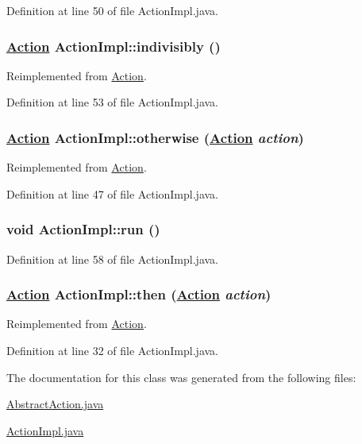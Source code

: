 Definition at line 50 of file Action\-Impl.java.\hypertarget{classActionImpl_a19}{
\subsubsection[indivisibly]{\setlength{\rightskip}{0pt plus 5cm}\hyperlink{interfaceAction}{Action} Action\-Impl::indivisibly ()}}
\label{classActionImpl_a19}




Reimplemented from \hyperlink{interfaceAction_a9}{Action}.

Definition at line 53 of file Action\-Impl.java.\hypertarget{classActionImpl_a17}{
\subsubsection[otherwise]{\setlength{\rightskip}{0pt plus 5cm}\hyperlink{interfaceAction}{Action} Action\-Impl::otherwise (\hyperlink{interfaceAction}{Action} {\em action})}}
\label{classActionImpl_a17}




Reimplemented from \hyperlink{interfaceAction_a7}{Action}.

Definition at line 47 of file Action\-Impl.java.\hypertarget{classActionImpl_a20}{
\subsubsection[run]{\setlength{\rightskip}{0pt plus 5cm}void Action\-Impl::run ()}}
\label{classActionImpl_a20}




Definition at line 58 of file Action\-Impl.java.\hypertarget{classActionImpl_a12}{
\subsubsection[then]{\setlength{\rightskip}{0pt plus 5cm}\hyperlink{interfaceAction}{Action} Action\-Impl::then (\hyperlink{interfaceAction}{Action} {\em action})}}
\label{classActionImpl_a12}




Reimplemented from \hyperlink{interfaceAction_a2}{Action}.

Definition at line 32 of file Action\-Impl.java.

The documentation for this class was generated from the following files:\begin{CompactItemize}
\item 
\hyperlink{AbstractAction_8java-source}{Abstract\-Action.java}\item 
\hyperlink{ActionImpl_8java-source}{Action\-Impl.java}\end{CompactItemize}
